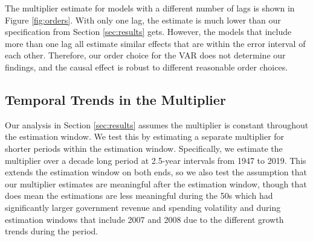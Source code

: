 The multiplier estimate for models with a different number of lags is shown in Figure \ref{fig:orders}. With only one lag, the estimate is much lower than our specification from Section \ref{sec:results} gets. However, the models that include more than one lag all estimate similar effects that are within the error interval of each other. Therefore, our order choice for the VAR does not determine our findings, and the causal effect is robust to different reasonable order choices.


\subsection{Temporal Trends in the Multiplier}

Our analysis in Section \ref{sec:results} assumes the multiplier is constant throughout the estimation window. We test this by estimating a separate multiplier for shorter periods within the estimation window. Specifically, we estimate the multiplier over a decade long period at 2.5-year intervals from 1947 to 2019. This extends the estimation window on both ends, so we also test the assumption that our multiplier estimates are meaningful after the estimation window, though that does mean the estimations are less meaningful during the 50s which had significantly larger government revenue and spending volatility and during estimation windows that include 2007 and 2008 due to the different growth trends during the period.

